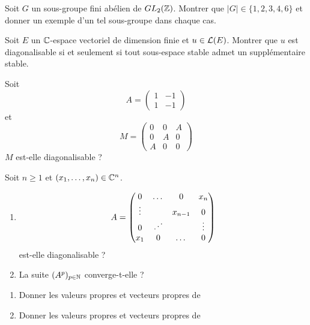 \documentclass[12pt]{article}
\begin{document}
\begin{exercise}
	Soit $G$ un sous-groupe fini abélien de $GL_{2}(\mathbb{Z})$. Montrer que $\vert G\vert\in\{1,2,3,4,6\}$ et donner un exemple d'un tel sous-groupe dans chaque cas.
\end{exercise}

\begin{exercise}
	Soit $E$ un $\mathbb{C}$-espace vectoriel de dimension finie et $u\in\mathcal{L}(E)$. Montrer que $u$ est diagonalisable si et seulement si tout sous-espace stable admet un supplémentaire stable.
\end{exercise}

\begin{exercise}
	Soit 
	$$
	A=
	\begin{pmatrix}
		1 & -1\\
		1 & -1
	\end{pmatrix}
	$$
	et 
	$$
	M=
	\begin{pmatrix}
		0 & 0 & A\\
		0 & A & 0\\
		A & 0 & 0
	\end{pmatrix}
	$$
	$M$ est-elle diagonalisable ?
\end{exercise}

\begin{exercise}
	Soit $n\geqslant1$ et $(x_{1},\dots,x_{n})\in\mathbb{C}^{n}$.
	\begin{enumerate}
		\item
		$$
		A=
		\begin{pmatrix}
			0 & \dots & 0 & x_{n}\\
			\vdots &  & x_{n-1} & 0\\
			0 & \reflectbox{$\ddots$} & & \vdots\\
			x_{1}& 0 &\dots & 0
		\end{pmatrix}
		$$
		est-elle diagonalisable ?
		\item La suite $(A^{p})_{p\in\mathbb{N}}$ converge-t-elle ?
	\end{enumerate}
\end{exercise}

\begin{exercise}
	\phantom{}
	\begin{enumerate}
		\item Donner les valeurs propres et vecteurs propres de 
		\item Donner les valeurs propres et vecteurs propres de 
	\end{enumerate}
\end{exercise}
\end{document}
